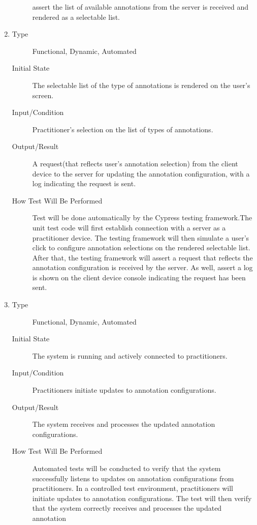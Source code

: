 \documentclass[12pt, titlepage]{article}
\begin{document}
\begin{enumerate}[FR-T1]
\begin{description}
    assert the list of available annotations from the server is received and
    rendered as a selectable list.
  \end{description}
\item \label{FRT5}
  \begin{description}
  \item[Type] Functional, Dynamic, Automated
  \item[Initial State] The selectable list of the type of annotations is
    rendered on the user's screen.
  \item[Input/Condition] Practitioner’s selection on the list of types of
    annotations.
  \item[Output/Result] A request(that reflects user’s annotation selection) from
    the client device to the server for updating the annotation configuration,
    with a log indicating the request is sent.
  \item[How Test Will Be Performed] Test will be done automatically by the
    Cypress testing framework.The unit test code will first establish connection
    with a server as a practitioner device. The testing framework will then
    simulate a user's click to configure annotation selections on the rendered
    selectable list. After that, the testing framework will assert a request
    that reflects the annotation configuration is received by the server. As
    well, assert a log is shown on the client device console indicating the
    request has been sent.
  \end{description}
\item \label{FRT6}
  \begin{description}
  \item[Type] Functional, Dynamic, Automated
  \item[Initial State] The system is running and actively connected to
    practitioners.
  \item[Input/Condition] Practitioners initiate updates to annotation
    configurations.
  \item[Output/Result] The system receives and processes the updated annotation
    configurations.
  \item[How Test Will Be Performed] Automated tests will be conducted to verify
    that the system successfully listens to updates on annotation configurations
    from practitioners. In a controlled test environment, practitioners will
    initiate updates to annotation configurations. The test will then verify
    that the system correctly receives and processes the updated annotation

\end{description}
\end{enumerate}
\end{document}
